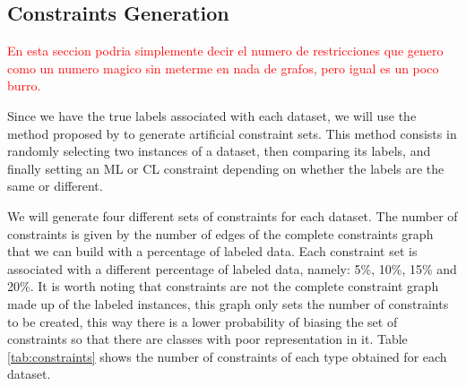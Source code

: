 \documentclass[review]{elsarticle}
\begin{document}
\clearpage

\subsection{Constraints Generation}

\textcolor{red}{En esta seccion podria simplemente decir el numero de restricciones que genero como un numero magico sin meterme en nada de grafos, pero igual es un poco burro.}

Since we have the true labels associated with each dataset, we will use the method proposed by \cite{wagstaff2001constrained} to generate artificial constraint sets. This method consists in randomly selecting two instances of a dataset, then comparing its labels, and finally setting an ML or CL constraint depending on whether the labels are the same or different.

We will generate four different sets of constraints for each dataset. The number of constraints is given by the number of edges of the complete constraints graph that we can build with a percentage of labeled data. Each constraint set is associated with a different percentage of labeled data, namely: 5\%, 10\%, 15\% and 20\%. It is worth noting that constraints are not the complete constraint graph made up of the labeled instances, this graph only sets the number of constraints to be created, this way there is a lower probability of biasing the set of constraints so that there are classes with poor representation in it. Table \ref{tab:constraints} shows the number of constraints of each type obtained for each dataset.
\end{document}
